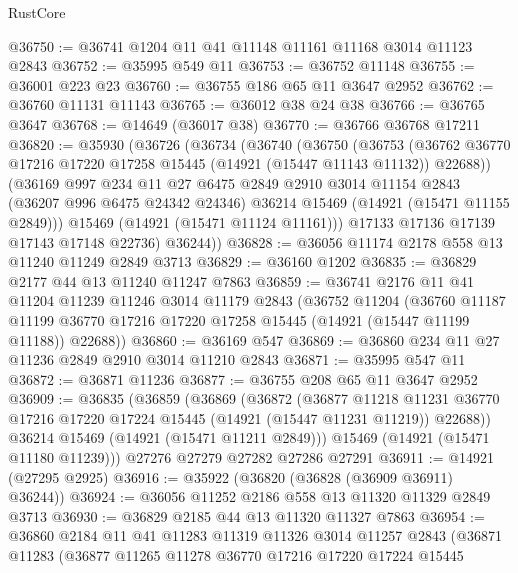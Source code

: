 \begin{lexlean}{RustCore}
\begin{coremodule}
@36750 := @36741 @1204 @11 @41 @11148 @11161 @11168 @3014 @11123 @2843
@36752 := @35995 @549 @11
@36753 := @36752 @11148
@36755 := @36001 @223 @23
@36760 := @36755 @186 @65 @11 @3647 @2952
@36762 := @36760 @11131 @11143
@36765 := @36012 @38 @24 @38
@36766 := @36765 @3647
@36768 := @14649 (@36017 @38)
@36770 := @36766 @36768 @17211
@36820 := @35930
    (@36726
      (@36734
        (@36740
          (@36750
            (@36753
              (@36762 @36770 @17216 @17220 @17258 @15445 (@14921 (@15447 @11143 @11132)) @22688))
            (@36169
              @997
              @234
              @11
              @27
              @6475
              @2849
              @2910
              @3014
              @11154
              @2843
              (@36207 @996 @6475 @24342 @24346)
              @36214
              @15469
              (@14921 (@15471 @11155 @2849)))
            @15469
            (@14921 (@15471 @11124 @11161)))
          @17133
          @17136
          @17139
          @17143
          @17148
          @22736)
        @36244))
@36828 := @36056 @11174 @2178 @558 @13 @11240 @11249 @2849 @3713
@36829 := @36160 @1202
@36835 := @36829 @2177 @44 @13 @11240 @11247 @7863
@36859 := @36741
    @2176
    @11
    @41
    @11204
    @11239
    @11246
    @3014
    @11179
    @2843
    (@36752
      @11204
      (@36760
        @11187
        @11199
        @36770
        @17216
        @17220
        @17258
        @15445
        (@14921 (@15447 @11199 @11188))
        @22688))
@36860 := @36169 @547
@36869 := @36860 @234 @11 @27 @11236 @2849 @2910 @3014 @11210 @2843
@36871 := @35995 @547 @11
@36872 := @36871 @11236
@36877 := @36755 @208 @65 @11 @3647 @2952
@36909 := @36835
    (@36859
      (@36869
        (@36872
          (@36877
            @11218
            @11231
            @36770
            @17216
            @17220
            @17224
            @15445
            (@14921 (@15447 @11231 @11219))
            @22688))
        @36214
        @15469
        (@14921 (@15471 @11211 @2849)))
      @15469
      (@14921 (@15471 @11180 @11239)))
    @27276
    @27279
    @27282
    @27286
    @27291
@36911 := @14921 (@27295 @2925)
@36916 := @35922 (@36820 (@36828 (@36909 @36911) @36244))
@36924 := @36056 @11252 @2186 @558 @13 @11320 @11329 @2849 @3713
@36930 := @36829 @2185 @44 @13 @11320 @11327 @7863
@36954 := @36860
    @2184
    @11
    @41
    @11283
    @11319
    @11326
    @3014
    @11257
    @2843
    (@36871
      @11283
      (@36877
        @11265
        @11278
        @36770
        @17216
        @17220
        @17224
        @15445

\end{coremodule}
\end{lexlean}
